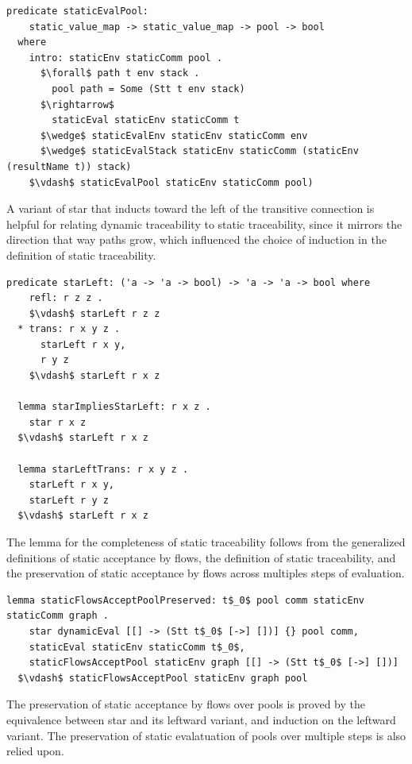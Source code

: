 \documentclass[letterpaper, 11pt]{extarticle}
\begin{document}
\begin{lstlisting}[language=logic, mathescape]
  predicate staticEvalPool:
    static_value_map -> static_value_map -> pool -> bool
  where
    intro: staticEnv staticComm pool .
      $\forall$ path t env stack .
        pool path = Some (Stt t env stack)
      $\rightarrow$ 
        staticEval staticEnv staticComm t
      $\wedge$ staticEvalEnv staticEnv staticComm env
      $\wedge$ staticEvalStack staticEnv staticComm (staticEnv (resultName t)) stack)
    $\vdash$ staticEvalPool staticEnv staticComm pool)
  \end{lstlisting}


A variant of star that inducts toward the left of the transitive connection is helpful for
relating dynamic traceability to static traceability, since it mirrors the direction that way
paths grow, which influenced the choice of induction in the definition of static
traceability.

\begin{lstlisting}[language=logic, mathescape]
  predicate starLeft: ('a -> 'a -> bool) -> 'a -> 'a -> bool where
    refl: r z z .
    $\vdash$ starLeft r z z
  * trans: r x y z .
      starLeft r x y,
      r y z
    $\vdash$ starLeft r x z

  lemma starImpliesStarLeft: r x z .
    star r x z
  $\vdash$ starLeft r x z

  lemma starLeftTrans: r x y z .
    starLeft r x y,
    starLeft r y z 
  $\vdash$ starLeft r x z
\end{lstlisting}

The lemma for the completeness of static traceability follows from the generalized definitions
of static acceptance by flows, the definition of static traceability, and the preservation
of static acceptance by flows across multiples steps of evaluation.

\begin{lstlisting}[language=logic, mathescape]
  lemma staticFlowsAcceptPoolPreserved: t$_0$ pool comm staticEnv staticComm graph .
    star dynamicEval [[] -> (Stt t$_0$ [->] [])] {} pool comm, 
    staticEval staticEnv staticComm t$_0$,
    staticFlowsAcceptPool staticEnv graph [[] -> (Stt t$_0$ [->] [])]
  $\vdash$ staticFlowsAcceptPool staticEnv graph pool 
\end{lstlisting}

The preservation of static acceptance by flows over pools is proved by the
equivalence between star and its leftward variant, and induction on the leftward variant.
The preservation of static evalatuation of pools over multiple steps is also relied upon.
\end{document}
